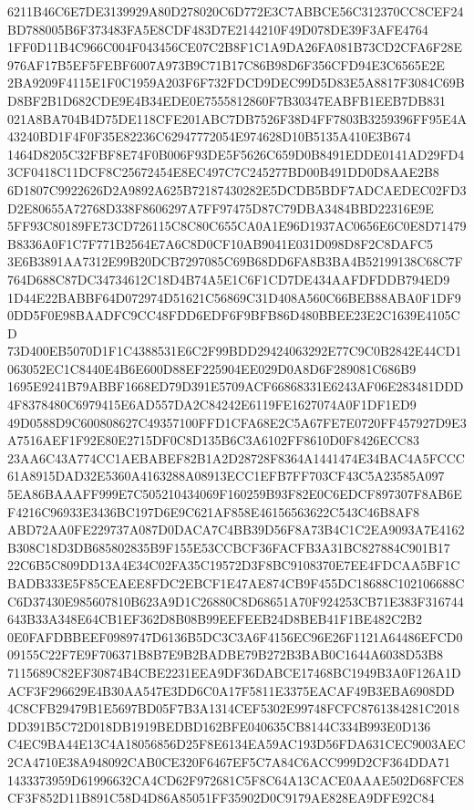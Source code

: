 \documentclass[UTF8,fontset=fandol,zihao=-4,a4paper]{ctexart}
\begin{document}
{{6211B46C6E7DE3139929A80D278020C6D772E3C7ABBCE56C312370CC8CEF24BD788005B6F373483FA5E8CDF483D7E2144210F49D078DE39F3AFE4764
1FF0D11B4C966C004F043456CE07C2B8F1C1A9DA26FA081B73CD2CFA6F28E976AF17B5EF5FEBF6007A973B9C71B17C86B98D6F356CFD94E3C6565E2E
2BA9209F4115E1F0C1959A203F6F732FDCD9DEC99D5D83E5A8817F3084C69BD8BF2B1D682CDE9E4B34EDE0E7555812860F7B30347EABFB1EEB7DB831
021A8BA704B4D75DE118CFE201ABC7DB7526F38D4FF7803B3259396FF95E4A43240BD1F4F0F35E82236C62947772054E974628D10B5135A410E3B674
1464D8205C32FBF8E74F0B006F93DE5F5626C659D0B8491EDDE0141AD29FD43CF0418C11DCF8C25672454E8EC497C7C245277BD00B491DD0D8AAE2B8
6D1807C9922626D2A9892A625B72187430282E5DCDB5BDF7ADCAEDEC02FD3D2E80655A72768D338F8606297A7FF97475D87C79DBA3484BBD22316E9E
5FF93C80189FE73CD726115C8C80C655CA0A1E96D1937AC0656E6C0E8D71479B8336A0F1C7F771B2564E7A6C8D0CF10AB9041E031D098D8F2C8DAFC5
3E6B3891AA7312E99B20DCB7297085C69B68DD6FA8B3BA4B52199138C68C7F764D688C87DC34734612C18D4B74A5E1C6F1CD7DE434AAFDFDDB794ED9
1D44E22BABBF64D072974D51621C56869C31D408A560C66BEB88ABA0F1DF90DD5F0E98BAADFC9CC48FDD6EDF6F9BFB86D480BBEE23E2C1639E4105CD
73D400EB5070D1F1C4388531E6C2F99BDD29424063292E77C9C0B2842E44CD1063052EC1C8440E4B6E600D88EF225904EE029D0A8D6F289081C686B9
1695E9241B79ABBF1668ED79D391E5709ACF66868331E6243AF06E283481DDD4F8378480C6979415E6AD557DA2C84242E6119FE1627074A0F1DF1ED9
49D0588D9C600808627C49357100FFD1CFA68E2C5A67FE7E0720FF457927D9E3A7516AEF1F92E80E2715DF0C8D135B6C3A6102FF8610D0F8426ECC83
23AA6C43A774CC1AEBABEF82B1A2D28728F8364A1441474E34BAC4A5FCCC61A8915DAD32E5360A4163288A08913ECC1EFB7FF703CF43C5A23585A097
5EA86BAAAFF999E7C505210434069F160259B93F82E0C6EDCF897307F8AB6EF4216C96933E3436BC197D6E9C621AF858E46156563622C543C46B8AF8
ABD72AA0FE229737A087D0DACA7C4BB39D56F8A73B4C1C2EA9093A7E4162B308C18D3DB685802835B9F155E53CCBCF36FACFB3A31BC827884C901B17
22C6B5C809DD13A4E34C02FA35C19572D3F8BC9108370E7EE4FDCAA5BF1CBADB333E5F85CEAEE8FDC2EBCF1E47AE874CB9F455DC18688C102106688C
C6D37430E985607810B623A9D1C26880C8D68651A70F924253CB71E383F316744643B33A348E64CB1EF362D8B08B99EEFEEB24D8BEB41F1BE482C2B2
0E0FAFDBBEEF0989747D6136B5DC3C3A6F4156EC96E26F1121A64486EFCD009155C22F7E9F706371B8B7E9B2BADBE79B272B3BAB0C1644A6038D53B8
7115689C82EF30874B4CBE2231EEA9DF36DABCE17468BC1949B3A0F126A1DACF3F296629E4B30AA547E3DD6C0A17F5811E3375EACAF49B3EBA6908DD
4C8CFB29479B1E5697BD05F7B3A1314CEF5302E99748FCFC8761384281C2018DD391B5C72D018DB1919BEDBD162BFE040635CB8144C334B993E0D136
C4EC9BA44E13C4A18056856D25F8E6134EA59AC193D56FDA631CEC9003AEC2CA4710E38A948092CAB0CE320F6467EF5C7A84C6ACC999D2CF364DDA71
1433373959D61996632CA4CD62F972681C5F8C64A13CACE0AAAE502D68FCE8CF3F852D11B891C58D4D86A85051FF35902D0C9179AE828EA9DFE92C84
}}
\end{document}

